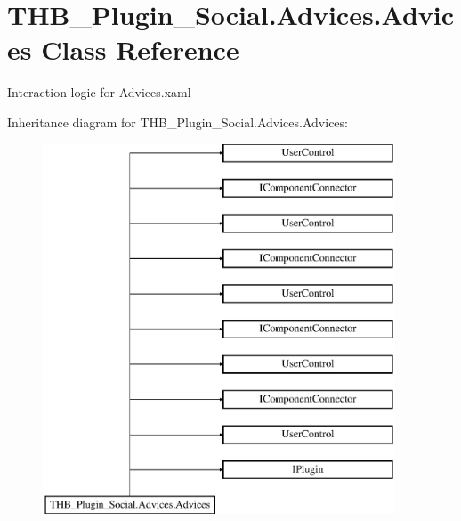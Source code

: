 \hypertarget{class_t_h_b___plugin___social_1_1_advices_1_1_advices}{}\section{T\+H\+B\+\_\+\+Plugin\+\_\+\+Social.\+Advices.\+Advices Class Reference}
\label{class_t_h_b___plugin___social_1_1_advices_1_1_advices}


Interaction logic for Advices.\+xaml  


Inheritance diagram for T\+H\+B\+\_\+\+Plugin\+\_\+\+Social.\+Advices.\+Advices\+:\begin{figure}[H]
\begin{center}
\leavevmode
\includegraphics[height=11.000000cm]{dc/d36/class_t_h_b___plugin___social_1_1_advices_1_1_advices}
\end{center}
\end{figure}
